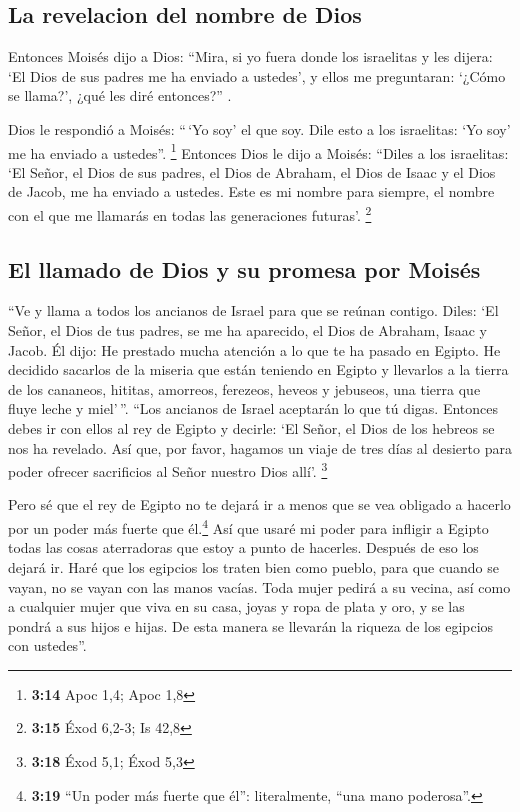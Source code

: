 \hypertarget{la-revelacion-del-nombre-de-dios}{%
\subsection{La revelacion del nombre de
Dios}\label{la-revelacion-del-nombre-de-dios}}

 Entonces Moisés dijo a Dios: ``Mira, si yo fuera donde
los israelitas y les dijera: `El Dios de sus padres me ha enviado a
ustedes', y ellos me preguntaran: `¿Cómo se llama?', ¿qué les diré
entonces?'' .

 Dios le respondió a Moisés: ``\,`Yo soy' el que soy.
Dile esto a los israelitas: `Yo soy' me ha enviado a ustedes''.
\footnote{\textbf{3:14} Apoc 1,4; Apoc 1,8}  Entonces
Dios le dijo a Moisés: ``Diles a los israelitas: `El Señor, el Dios de
sus padres, el Dios de Abraham, el Dios de Isaac y el Dios de Jacob, me
ha enviado a ustedes. Este es mi nombre para siempre, el nombre con el
que me llamarás en todas las generaciones futuras'. \footnote{\textbf{3:15}
  Éxod 6,2-3; Is 42,8}

\hypertarget{el-llamado-de-dios-y-su-promesa-por-moisuxe9s}{%
\subsection{El llamado de Dios y su promesa por
Moisés}\label{el-llamado-de-dios-y-su-promesa-por-moisuxe9s}}

 ``Ve y llama a todos los ancianos de Israel para que se
reúnan contigo. Diles: `El Señor, el Dios de tus padres, se me ha
aparecido, el Dios de Abraham, Isaac y Jacob. Él dijo: He prestado mucha
atención a lo que te ha pasado en Egipto.  He decidido
sacarlos de la miseria que están teniendo en Egipto y llevarlos a la
tierra de los cananeos, hititas, amorreos, ferezeos, heveos y jebuseos,
una tierra que fluye leche y miel'\,''.  ``Los ancianos
de Israel aceptarán lo que tú digas. Entonces debes ir con ellos al rey
de Egipto y decirle: `El Señor, el Dios de los hebreos se nos ha
revelado. Así que, por favor, hagamos un viaje de tres días al desierto
para poder ofrecer sacrificios al Señor nuestro Dios allí'. \footnote{\textbf{3:18}
  Éxod 5,1; Éxod 5,3}

 Pero sé que el rey de Egipto no te dejará ir a menos que
se vea obligado a hacerlo por un poder más fuerte que él.\footnote{\textbf{3:19}
  ``Un poder más fuerte que él'': literalmente, ``una mano poderosa''.}
 Así que usaré mi poder para infligir a Egipto todas las
cosas aterradoras que estoy a punto de hacerles. Después de eso los
dejará ir.  Haré que los egipcios los traten bien como
pueblo, para que cuando se vayan, no se vayan con las manos vacías.
 Toda mujer pedirá a su vecina, así como a cualquier
mujer que viva en su casa, joyas y ropa de plata y oro, y se las pondrá
a sus hijos e hijas. De esta manera se llevarán la riqueza de los
egipcios con ustedes''.

